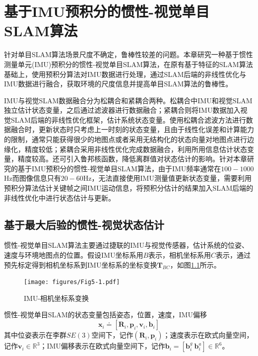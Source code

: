 
\chapter{基于IMU预积分的惯性-视觉单目SLAM算法}
\label{chap:VISLAM}
针对单目SLAM算法场景尺度不确定，鲁棒性较差的问题。本章研究一种基于惯性测量单元(IMU)预积分的惯性-视觉单目SLAM算法，在原有基于特征的SLAM算法基础上，使用预积分算法\upcite{[5.1]}对IMU数据进行处理，通过SLAM后端的非线性优化与IMU数据进行融合，获取环境的尺度信息并提高单目SLAM算法的鲁棒性。

IMU与视觉SLAM数据融合分为松耦合和紧耦合两种\upcite{[5.2]}。松耦合中IMU和视觉SLAM独立估计状态变量，之后通过滤波器进行数据融合；紧耦合则将IMU数据加入视觉SLAM后端的非线性优化框架，估计系统状态变量。使用松耦合滤波方法进行数据融合时，更新状态时只考虑上一时刻的状态变量，且由于线性化误差和计算能力的限制，通常只能获得很少的地图点或者采用无结构化的状态向量对地图点进行边缘化，精度较低；紧耦合采用非线性优化完成数据融合，利用所用信息估计状态变量，精度较高。还可引入鲁邦核函数，降低离群值对状态估计的影响。针对本章研究的基于IMU预积分的惯性-视觉单目SLAM算法，由于IMU频率通常在$100-1000$Hz而图像信息只有$20-60$Hz，无法直接使用IMU测量值更新状态变量，需要利用预积分算法估计关键帧之间IMU运动信息，将预积分估计的结果加入SLAM后端的非线性优化中进行状态估计与更新。


\section{基于最大后验的惯性-视觉状态估计}
惯性-视觉单目SLAM算法主要通过捷联的IMU与视觉传感器，估计系统的位姿、速度与环境地图点的位置。假设IMU坐标系用$B$表示，相机坐标系用$C$表示，通过预先标定得到相机坐标系到IMU坐标系的坐标变换$\boldsymbol{T}_{BC}$，如图\ref{fig5.1}所示。

\begin{figure}
\centering
\texttt{[image: figures/Fig5-1.pdf]}
\caption{IMU-相机坐标系变换}
\label{fig5.1}
\end{figure}

惯性-视觉单目SLAM的状态变量包括姿态，位置，速度，IMU偏移
\begin{equation}
\label{equ5.1}
\boldsymbol{x}_i \doteq \left[ \boldsymbol{R}_i,\boldsymbol{p}_i,\boldsymbol{v}_i,\boldsymbol{b}_i \right]
\end{equation}
其中位姿表示在李群$SE(3)$空间下，记作$\left( \boldsymbol{R}_i, \boldsymbol{p}_i \right)$；速度表示在欧式向量空间，记作$\boldsymbol{v}_i \in \mathds{R}^3 $；IMU偏移表示在欧式向量空间下，记作$\boldsymbol{b}_i=[\boldsymbol{b}_i^g \ \boldsymbol{b}_i^a] \in \mathds{R}^6$。

